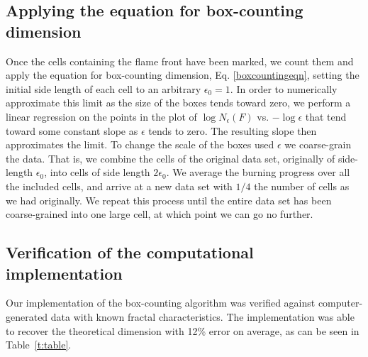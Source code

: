 \subsection{Applying the equation for box-counting dimension}
Once the cells containing the flame front have been marked, we count them and apply the equation for box-counting dimension, Eq. \ref{boxcountingeqn}, setting the initial side length of each cell to an arbitrary $\epsilon_0 = 1$. In order to numerically approximate this limit as the size of the boxes tends toward zero, we perform a linear regression on the points in the plot of $\log N_\epsilon (F)$ vs. $-\log \epsilon$ that tend toward some constant slope as $\epsilon$ tends to zero. The resulting slope then approximates the limit. To change the scale of the boxes used $\epsilon$ we coarse-grain the data. That is, we combine the cells of the original data set, originally of side-length $\epsilon_0$, into cells of side length $2\epsilon_0$. We average the burning progress over all the included cells, and arrive at a new data set with $1/4$ the number of cells as we had originally. We repeat this process until the entire data set has been coarse-grained into one large cell, at which point we can go no further.

\subsection{Verification of the computational implementation}
Our implementation of the box-counting algorithm was verified against computer-generated data with known fractal characteristics. The implementation was able to recover the theoretical dimension with 12\% error on average, as can be seen in Table~\ref{t:table}.

